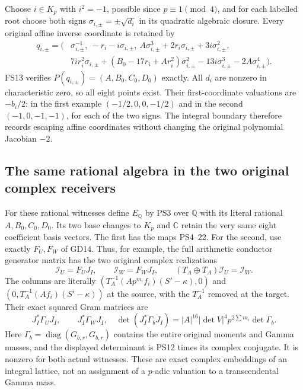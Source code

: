 \documentclass[11pt]{article}
\newcommand{\diag}{\operatorname{diag}}
\begin{document}
Choose $i\in K_p$ with $i^2=-1$, possible since $p\equiv1\pmod4$,
and for each labelled root choose both signs
$\sigma_{i,\pm}=\pm\sqrt{d_i}$ in its quadratic algebraic closure.
Every original affine inverse coordinate is retained by
\[
 \begin{aligned}
 q_{i,\pm}=\big(&\sigma_{i,\pm}^{-1},\
 -r_i-i\sigma_{i,\pm},\
 A\sigma_{i,\pm}^3+2r_i\sigma_{i,\pm}+3i\sigma_{i,\pm}^2,\\
 &7ir_i^2\sigma_{i,\pm}
 +(B_0-17r_i+Ar_i^2)\sigma_{i,\pm}^2
 -13i\sigma_{i,\pm}^3-2A\sigma_{i,\pm}^4\big).
 \end{aligned}\tag{PS22}
\]
FS13 verifies $P(q_{i,\pm})=(A,B_0,C_0,D_0)$ exactly.
All $d_i$ are nonzero in characteristic zero, so all eight points exist.
Their first-coordinate valuations are $-b_i/2$:
in the first example $(-1/2,0,0,-1/2)$ and in the second
$(-1,0,-1,-1)$, for each of the two signs.
The integral boundary therefore records escaping affine coordinates
without changing the original polynomial Jacobian $-2$.

\subsection{The same rational algebra in the two original complex receivers}
For these rational witnesses define $E_{\mathbb Q}$ by PS3 over
$\mathbb Q$ with its literal rational $A,B_0,C_0,D_0$.
Its two base changes to $K_p$ and $\mathbb C$ retain the very same
eight coefficient basis vectors. The first has the maps PS4--22.
For the second, use exactly $F_U,F_W$ of GD14.
Thus, for example, the full arithmetic conductor generator matrix has
the two original complex realizations
\[
 \mathcal I_U=F_UJ_I,\qquad
 \mathcal I_W=F_WJ_I,\qquad
 (T_A\oplus T_A)\mathcal I_U=\mathcal I_W .
 \tag{PS23}
\]
The columns are literally
$(T_A^{-1}(Ap^{m_i}f_i)(S'-\kappa),0)$ and
$(0,T_A^{-1}(Af_i)(S'-\kappa))$ at the source, with the
$T_A^{-1}$ removed at the target. Their exact squared Gram matrices are
\[
 J_I^*\Gamma_UJ_I,\qquad J_I^*\Gamma_WJ_I,\quad
 \det(J_I^*\Gamma_bJ_I)
   =|A|^{16}|\det V|^4p^{2\sum m_i}\det\Gamma_b .
 \tag{PS24}
\]
Here $\Gamma_b=\diag(G_{b,r},G_{b,r})$ contains the entire original
moments and Gamma masses, and the displayed determinant is PS12
times its complex conjugate. It is nonzero for both actual witnesses.
These are exact complex embeddings of an integral lattice, not an
assignment of a $p$-adic valuation to a transcendental Gamma mass.
\end{document}
